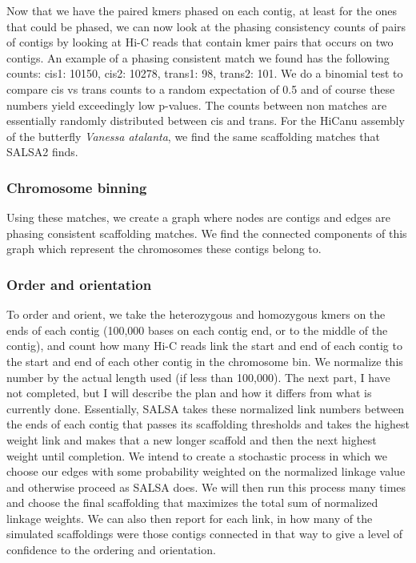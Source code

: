 {\par{
Now that we have the paired kmers phased on each contig, at least for the ones that could be phased, we can now look at the phasing consistency counts of pairs of contigs by looking at Hi-C reads that contain kmer pairs that occurs on two contigs. An example of a phasing consistent match we found has the following counts:  cis1: 10150, cis2: 10278, trans1: 98, trans2: 101. We do a binomial test to compare cis vs trans counts to a random expectation of 0.5 and of course these numbers yield exceedingly low p-values. The counts between non matches are essentially randomly distributed between cis and trans. For the HiCanu assembly of the butterfly \textit{Vanessa atalanta}, we find the same scaffolding matches that SALSA2 finds.
}

\subsubsection{Chromosome binning}

\par{
Using these matches, we create a graph where nodes are contigs and edges are phasing consistent scaffolding matches. We find the connected components of this graph which represent the chromosomes these contigs belong to. 
}

\subsubsection{Order and orientation}

\par{
To order and orient, we take the heterozygous and homozygous kmers on the ends of each contig (100,000 bases on each contig end, or to the middle of the contig), and count how many Hi-C reads link the start and end of each contig to the start and end of each other contig in the chromosome bin. We normalize this number by the actual length used (if less than 100,000). The next part, I have not completed, but I will describe the plan and how it differs from what is currently done. Essentially, SALSA takes these normalized link numbers between the ends of each contig that passes its scaffolding thresholds and takes the highest weight link and makes that a new longer scaffold and then the next highest weight until completion. We intend to create a stochastic process in which we choose our edges with some probability weighted on the normalized linkage value and otherwise proceed as SALSA does. We will then run this process many times and choose the final scaffolding that maximizes the total sum of normalized linkage weights. We can also then report for each link, in how many of the simulated scaffoldings were those contigs connected in that way to give a level of confidence to the ordering and orientation.
}

}
